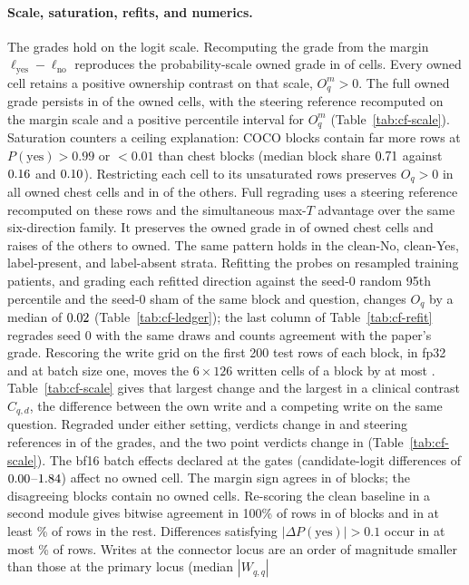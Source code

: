 \paragraph{Scale, saturation, refits, and numerics.} The grades hold on the logit scale. Recomputing the grade from the margin $\ell_{\mathrm{yes}}-\ell_{\mathrm{no}}$ reproduces the probability-scale owned grade in \cfScaleAgree{} of \cfScaleAgreeN{} cells. Every owned cell retains a positive ownership contrast on that scale, $O^m_q>0$. The full owned grade persists in \cfScaleOwnedKeepFull{} of the \cfScaleOwned{} owned cells, with the steering reference recomputed on the margin scale and a positive percentile interval for $O^m_q$ (Table~\ref{tab:cf-scale}). Saturation counters a ceiling explanation: COCO blocks contain far more rows at $P(\mathrm{yes})>0.99$ or $<0.01$ than chest blocks (median block share $0.71$ against $0.16$ and $0.10$). Restricting each cell to its unsaturated rows preserves $O_q>0$ in all \cfScaleUnsatOwned{} owned chest cells and in \cfScaleUnsatOtherPos{} of the \cfScaleUnsatOther{} others. Full regrading uses a steering reference recomputed on these rows and the simultaneous max-$T$ advantage over the same six-direction family. It preserves the owned grade in \cfScaleUnsatGradeKept{} of \cfScaleUnsatGradeN{} owned chest cells and raises \cfScaleUnsatGradeGained{} of the \cfScaleUnsatGradeOtherN{} others to owned. The same pattern holds in the clean-No, clean-Yes, label-present, and label-absent strata. Refitting the probes on resampled training patients, and grading each refitted direction against the seed-0 random 95th percentile and the seed-0 sham of the same block and question, changes $O_q$ by a median of $0.02$ (Table~\ref{tab:cf-ledger}); the last column of Table~\ref{tab:cf-refit} regrades seed 0 with the same draws and counts agreement with the paper's grade. Rescoring the write grid on the first 200 test rows of each block, in fp32 and at batch size one, moves the $6\times126$ written cells of a block by at most \cfPrecisionMaxDW{}. Table~\ref{tab:cf-scale} gives that largest change and the largest in a clinical contrast $C_{q,d}$, the difference between the own write and a competing write on the same question. Regraded under either setting, verdicts change in \cfPrecisionVerdictChanges{} and steering references in \cfPrecisionRefChanges{} of the \cfPrecisionGradeCells{} grades, and the two point verdicts change in \cfPrecisionPointVerdictChanges{} (Table~\ref{tab:cf-scale}). The bf16 batch effects declared at the gates (candidate-logit differences of $0.00$--$1.84$) affect no owned cell. The margin sign agrees in \cfScaleBatchAgree{} of \cfScaleBatchN{} blocks; the \cfScaleBatchDisagree{} disagreeing blocks contain no owned cells. Re-scoring the clean baseline in a second module gives bitwise agreement in 100\% of rows in \cfScaleBaselineIdentical{} of \cfScaleBaselineN{} blocks and in at least \cfScaleBaselineRestPct\% of rows in the rest. Differences satisfying $|\Delta P(\mathrm{yes})|>0.1$ occur in at most \cfScaleBaselineDpPct\% of rows. Writes at the connector locus are an order of magnitude smaller than those at the primary locus (median $|W_{q,q}|$ 